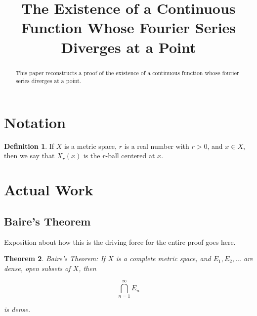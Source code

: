 \documentclass{amsart}
\newtheorem{thm}{Theorem}[section]
\theoremstyle{definition}
\newtheorem{definition}[thm]{Definition}
\begin{document}
\title{The Existence of a Continuous Function Whose Fourier Series Diverges at a Point}

\maketitle

\begin{abstract}
This paper reconstructs a proof of the existence of a continuous function whose fourier series diverges at a point.
\end{abstract}

\section{Notation}

\begin{definition}If $X$ is a metric space, $r$ is a real number with $r>0$, and $x \in X$, then we say that $X_r(x)$ is the $r$-ball centered at $x$.

\end{definition}

\section{Actual Work}

\subsection{Baire's Theorem}

Exposition about how this is the driving force for the entire proof goes here.

\begin{thm} Baire's Theorem: If $X$ is a complete metric space, and $E_1, E_2, \ldots$ are dense, open subsets of $X$, then

\begin{displaymath}
\bigcap\limits_{n = 1}^{\infty} E_n
\end{displaymath}

is dense.
\end{thm}
\end{document}
